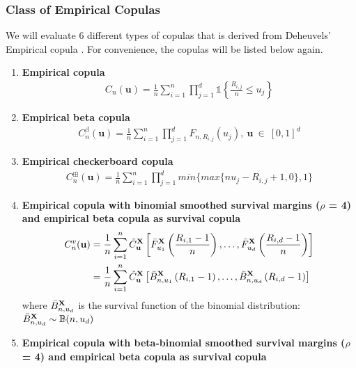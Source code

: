 \documentclass[12pt]{report}
\newcommand{\1}{\mathbf{1}}
\begin{document}
\begin{flushleft}
\subsubsection{Class of Empirical Copulas}

We will evaluate 6 different types of copulas that is derived from Deheuvels' Empirical copula \parencite{DeheuvelsEC}. For convenience, the copulas will be listed below again.
\begin{enumerate}
\item \textbf{Empirical copula}
\begin{align*}
C_{n}(\textbf{u}) = \frac{1}{n} \sum\limits_{i = 1}^{n} \prod\limits_{j = 1}^{d} \mathds{1}\left\{ \frac{R_{i,j}}{n} \le u_{j} \right\}
\end{align*}
\item \textbf{Empirical beta copula}
\begin{align*}
C^{\beta}_{n}(\textbf{u}) = \frac{1}{n} \sum\limits_{i = 1}^{n} \prod\limits_{j = 1}^{d} F_{n,R_{i,j}}(u_{j}), \: \textbf{u} \: \in \: [0,1]^{d}
\end{align*}
\item \textbf{Empirical checkerboard copula}
\begin{align*}
C_{n}^{\boxplus}(\textbf{u}) = \frac{1}{n} \sum\limits_{i = 1}^{n} \prod\limits_{j = 1}^{d} min \{ max \{ n u_{j} - R_{i,j} + 1, 0 \}, 1 \}
\end{align*}
\item \textbf{Empirical copula with binomial smoothed survival margins ($\rho$ = 4) and empirical beta copula as survival copula}
\begin{align*}
C_{n}^{v}(\textbf{u}) &= \frac{1}{n} \sum\limits_{i = 1}^{n} \Tilde{C}_{\textbf{u}}^{\textbf{X}} \left[\Bar{F}_{u_{1}}^{\textbf{X}}\left(\frac{R_{i,1} - 1}{n}\right), \dots, \Bar{F}_{u_{d}}^{\textbf{X}}\left(\frac{R_{i,d} - 1}{n}\right) \right] \\
&= \frac{1}{n} \sum\limits_{i = 1}^{n} \Tilde{C}_{\textbf{u}}^{\textbf{X}} \left[\Bar{B}_{n, u_{1}}^{\textbf{X}}\left(R_{i,1} - 1\right), \dots, \Bar{B}_{n, u_{d}}^{\textbf{X}}\left(R_{i,d} - 1\right) \right]
\end{align*}
where $\Bar{B}_{n, u_{d}}^{\textbf{X}}$ is the survival function of the binomial distribution: $\Bar{B}_{n, u_{d}}^{\textbf{X}} \sim \mathbb{B}(n, u_{d})$
\item \textbf{Empirical copula with beta-binomial smoothed survival margins ($\rho$ = 4) and empirical beta copula as survival copula}
\begin{align*}

\end{align*}
\end{enumerate}
\end{flushleft}
\end{document}
